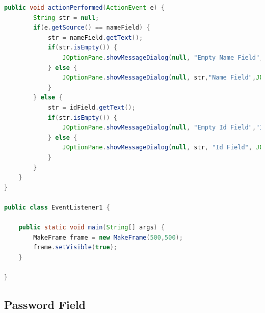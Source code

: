 \begin{frame}
\begin{lstlisting}[language=java]
	public void actionPerformed(ActionEvent e) {
		String str = null;
		if(e.getSource() == nameField) {
			str = nameField.getText();
			if(str.isEmpty()) {
				JOptionPane.showMessageDialog(null, "Empty Name Field","Name Field",JOptionPane.WARNING_MESSAGE);
			} else {
				JOptionPane.showMessageDialog(null, str,"Name Field",JOptionPane.PLAIN_MESSAGE);
			}
		} else {
			str = idField.getText();
			if(str.isEmpty()) {
				JOptionPane.showMessageDialog(null, "Empty Id Field","Id Field",JOptionPane.WARNING_MESSAGE);
			} else {
				JOptionPane.showMessageDialog(null, str, "Id Field", JOptionPane.PLAIN_MESSAGE);
			}
		}
	}
}

public class EventListener1 {

	public static void main(String[] args) {
		MakeFrame frame = new MakeFrame(500,500);
		frame.setVisible(true);
	}

}
\end{lstlisting}


\end{frame}


\newpage
\subsection{Password Field}


